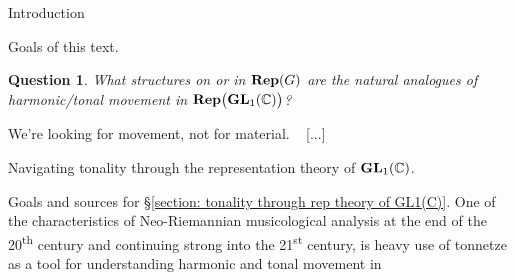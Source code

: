 \documentclass[letterpaper,11pt, reqno]{amsart}
\newtheorem{monodromy theorem}{Monodromy Theorem}[subsection]
\newtheorem{wild conjecture}[theorem]{Wild Conjecture}
\newtheorem{research objectives}{Research objectives}[subsection]
\newtheorem{question}[theorem]{Question}
\newtheorem{research question}[theorem]{Research questions}
\newtheorem{aside question}[theorem]{Aside question}
\newtheorem{audio example}[theorem]{\loudspeaker[3] Example}
\newtheorem{blank remark}[theorem]{}
\newtheorem{terminology and comment}[theorem]{Terminology and comment}
\newtheorem{purity hypothesis}[theorem]{Purity hypothesis}
\newtheorem{corollary of the purity hypothesis}[theorem]{Corollary of the purity hypothesis}
\newcommand{\CC} {{\mathbb C}}
\numberwithin{equation}{theorem}
\begin{document}
\begin{section}{Introduction}
\begin{subsection}{Goals of this text.}
\begin{question}
\normalfont
What structures on or in $\bold{Rep}(G)$ are the natural analogues of harmonic/tonal movement in $\bold{Rep}\big(\bold{GL}_{1}(\CC)\big)$?
\end{question}

\end{subsection}

\begin{subsection}{We're looking for movement, not for material.}
\ {\color{red} [...]}
\end{subsection}
	
\end{section}

\vskip 1cm

\begin{section}{Navigating tonality through the representation theory of $\bold{GL}_{1}(\CC)$.}\label{section: tonality through rep theory of GL1(C)}

\begin{subsection}{Goals and sources for \S\ref{section: tonality through rep theory of GL1(C)}.}
	One of the characteristics of Neo-Riemannian musicological analysis at the end of the 20\textsuperscript{th} century and continuing strong into the 21\textsuperscript{st} century, is heavy use of tonnetze as a tool for understanding harmonic and tonal movement in 


\end{subsection}
\end{section}
\end{document}
